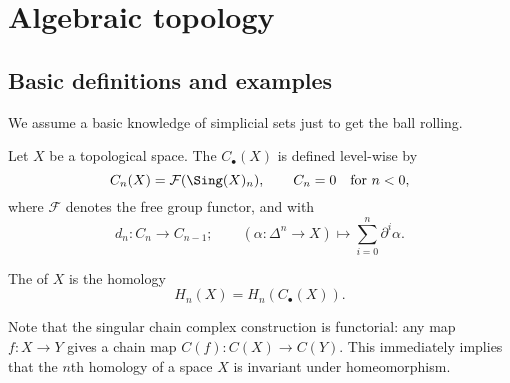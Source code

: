 \documentclass[main.tex]{subfiles}
\begin{document}
\chapter{Algebraic topology}
\label{ch:algebraic_topology}

\section{Basic definitions and examples}
\label{sec:basic_definitions}

We assume a basic knowledge of simplicial sets just to get the ball rolling.

\begin{definition}
  \label{def:singular_complex_homology}
  Let $X$ be a topological space. The  $C_{\bullet}(X)$ is defined level-wise by
  \begin{equation*}
    C_{n}(X) = \mathcal{F}(\Sing(X)_{n}),\qquad C_{n} = 0 \quad \text{for }n < 0,
  \end{equation*}
  where $\mathcal{F}$ denotes the free group functor, and with
  \begin{equation*}
    d_{n}\colon C_{n} \to C_{n-1};\qquad (\alpha\colon \Delta^{n} \to X) \mapsto \sum_{i = 0}^{n} \partial^{i} \alpha.
  \end{equation*}

  The  of $X$ is the homology 
  \begin{equation*}
    H_{n}(X) = H_{n}(C_{\bullet}(X)).
  \end{equation*}
\end{definition}

Note that the singular chain complex construction is functorial: any map $f\colon X \to Y$ gives a chain map $C(f)\colon C(X) \to C(Y)$. This immediately implies that the $n$th homology of a space $X$ is invariant under homeomorphism.
\end{document}
